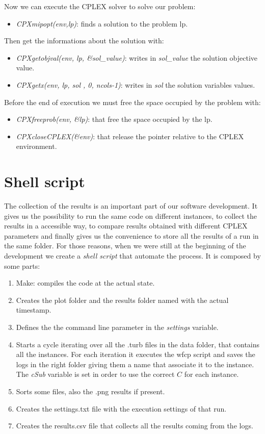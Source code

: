 \begin{appendices}
Now we can execute the \textsc{CPLEX} solver to solve our problem:
\begin{itemize}
\item \textit{CPXmipopt(env,lp)}: finds a solution to the problem lp.
\end{itemize}
Then get the informations about the solution with:
\begin{itemize}
\item \textit{CPXgetobjval(env, lp, \&sol\_value)}: writes in \textit{sol\_value} the solution objective value.
\item \textit{CPXgetx(env, lp, sol , 0, ncols-1)}: writes in \textit{sol} the solution variables values.
\end{itemize}

Before the end of execution we must free the space occupied by the problem with:
\begin{itemize}
\item \textit{CPXfreeprob(env, \&lp)}: that free the space occupied by the lp.
\item \textit{CPXcloseCPLEX(\&env)}: that release the pointer relative to the \textsc{CPLEX} environment.
\end{itemize}


\chapter{Shell script}
The collection of the results is an important part of our software development. It gives us the possibility to run the same code on different instances, to collect the results in a accessible way, to compare results obtained with different CPLEX parameters and finally gives us the convenience to store all the results of a run in the same folder. 
For those reasons, when we were still at the beginning of the development we create a \textit{shell script} that automate the process. It is composed by some parts:
\begin{enumerate}
\item Make: compiles the code at the actual state.
\item Creates the plot folder and the results folder named with the actual timestamp.
\item Defines the the command line parameter in the \textit{settings} variable.
\item Starts a cycle iterating over all the .turb files in the data folder, that contains all the instances. For each iteration it executes the wfcp script and saves the logs in the right folder giving them a name that associate it to the instance. The \textit{cSub} variable is set in order to use the correct $C$ for each instance.
\item Sorts some files, also the .png results if present.
\item Creates the settings.txt file with the execution settings of that run.
\item Creates the results.csv file that collects all the results coming from the logs.
\end{enumerate}


\end{appendices}
